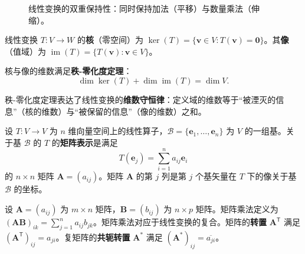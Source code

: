 \begin{figure}[htbp]
\centering
{}
\caption{线性变换的双重保持性：同时保持加法（平移）与数量乘法（伸缩）。}
\label{fig:linear_transformation_property}
\end{figure}

\begin{definition}[核与像]\label{def:kernel_image}
线性变换 $T: V \to W$ 的\textbf{核}（零空间）为 $\ker(T) = \{\mathbf{v} \in V : T(\mathbf{v}) = \mathbf{0}\}$。其\textbf{像}（值域）为 $\operatorname{im}(T) = \{T(\mathbf{v}) : \mathbf{v} \in V\}$。

核与像的维数满足\textbf{秩-零化度定理}：
\[
\dim \ker(T) + \dim \operatorname{im}(T) = \dim V.
\]

秩-零化度定理表达了线性变换的\textbf{维数守恒律}：定义域的维数等于“被湮灭的信息”（核的维数）与“被保留的信息”（像的维数）之和。
\end{definition}

\begin{definition}[矩阵表示]\label{def:matrix_representation}
设 $T: V \to V$ 为 $n$ 维向量空间上的线性算子，$\mathcal{B} = \{\mathbf{e}_1, \dots, \mathbf{e}_n\}$ 为 $V$ 的一组基。关于基 $\mathcal{B}$ 的 $T$ 的\textbf{矩阵表示}是满足
\[
T(\mathbf{e}_j) = \sum_{i=1}^n a_{ij} \mathbf{e}_i
\]
的 $n \times n$ 矩阵 $\mathbf{A} = (a_{ij})$。矩阵 $\mathbf{A}$ 的第 $j$ 列是第 $j$ 个基矢量在 $T$ 下的像关于基 $\mathcal{B}$ 的坐标。
\end{definition}

\begin{definition}[矩阵运算]\label{def:matrix_operations}
设 $\mathbf{A} = (a_{ij})$ 为 $m \times n$ 矩阵，$\mathbf{B} = (b_{ij})$ 为 $n \times p$ 矩阵。矩阵乘法定义为 $(\mathbf{A}\mathbf{B})_{ik} = \sum_{j=1}^n a_{ij} b_{jk}$。矩阵乘法对应于线性变换的复合。矩阵的\textbf{转置} $\mathbf{A}^{\mathsf T}$ 满足 $(\mathbf{A}^{\mathsf T})_{ij} = a_{ji}$。复矩阵的\textbf{共轭转置} $\mathbf{A}^*$ 满足 $(\mathbf{A}^*)_{ij} = \overline{a_{ji}}$。
\end{definition}

